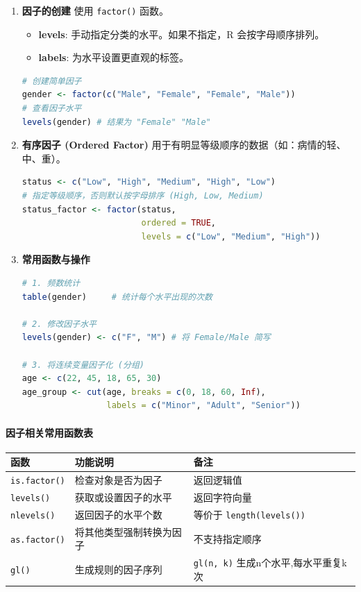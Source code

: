 \begin{enumerate}[label=\arabic*., leftmargin=2em]
    \item \textbf{因子的创建}
    使用 \texttt{factor()} 函数。
    \begin{itemize}
        \item \textbf{levels}: 手动指定分类的水平。如果不指定，R 会按字母顺序排列。
        \item \textbf{labels}: 为水平设置更直观的标签。
    \end{itemize}
\begin{lstlisting}[language=R]
# 创建简单因子
gender <- factor(c("Male", "Female", "Female", "Male"))
# 查看因子水平
levels(gender) # 结果为 "Female" "Male"
\end{lstlisting}

    \item \textbf{有序因子 (Ordered Factor)}
    用于有明显等级顺序的数据（如：病情的轻、中、重）。
\begin{lstlisting}[language=R]
status <- c("Low", "High", "Medium", "High", "Low")
# 指定等级顺序，否则默认按字母排序 (High, Low, Medium)
status_factor <- factor(status, 
                        ordered = TRUE, 
                        levels = c("Low", "Medium", "High"))
\end{lstlisting}

    \item \textbf{常用函数与操作}
\begin{lstlisting}[language=R]
# 1. 频数统计
table(gender)     # 统计每个水平出现的次数

# 2. 修改因子水平
levels(gender) <- c("F", "M") # 将 Female/Male 简写

# 3. 将连续变量因子化 (分组)
age <- c(22, 45, 18, 65, 30)
age_group <- cut(age, breaks = c(0, 18, 60, Inf), 
                 labels = c("Minor", "Adult", "Senior"))
\end{lstlisting}
\end{enumerate}



\paragraph{因子相关常用函数表}
\begin{table}[h]
\centering
\renewcommand{\arraystretch}{1.5}
\begin{tabular}{|l|l|l|}
\hline
\textbf{函数} & \textbf{功能说明} & \textbf{备注} \\ \hline
\texttt{is.factor()} & 检查对象是否为因子 & 返回逻辑值 \\ \hline
\texttt{levels()} & 获取或设置因子的水平 & 返回字符向量 \\ \hline
\texttt{nlevels()} & 返回因子的水平个数 & 等价于 \texttt{length(levels())} \\ \hline
\texttt{as.factor()} & 将其他类型强制转换为因子 & 不支持指定顺序 \\ \hline
\texttt{gl()} & 生成规则的因子序列 & \texttt{gl(n, k)} 生成n个水平,每水平重复k次 \\ \hline
\end{tabular}
\end{table}

